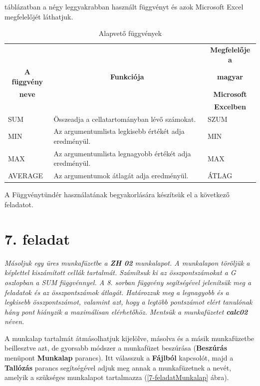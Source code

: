  táblázatban a négy leggyakrabban használt
függvényt és azok Microsoft Excel megfelelőjét láthatjuk.

\begin{table}[!h]
\begin{center}
\caption{Alapvető függvények}\label{AlapvetőFüggvények}
\begin{tabular}{|m{2.5cm}|m{8cm}|m{3cm}|}
\hline
 & & \multicolumn{1}{c|}{\textbf{Megfelelője a}} \\
\multicolumn{1}{|c|}{\textbf{A függvény}}&
\multicolumn{1}{c|}{\textbf{Funkciója}}&
\multicolumn{1}{c|}{\textbf{magyar}} \\
\multicolumn{1}{|c|}{\textbf{neve}} & &
\multicolumn{1}{c|}{\textbf{Microsoft}} \\
 & & \multicolumn{1}{c|}{\textbf{Excelben}} \\
\hline
SUM & Összeadja a cellatartományban lévő számokat. & SZUM \\
\hline
MIN & Az argumentumlista legkisebb értékét adja eredményül. & MIN \\
\hline
MAX & Az argumentumlista legnagyobb értékét adja eredményül. & MAX \\   
\hline
AVERAGE & Az argumentumok átlagát adja eredményül. & ÁTLAG \\
\hline
\end{tabular}
\end{center}
\end{table}

A Függvénytündér használatának begyakorlására
készítsük el a következő feladatot.


\section{7. feladat}

{\itshape
Másoljuk egy üres munkafüzetbe a \textbf{ZH 02} munkalapot. A
munkalapon töröljük a képlettel kiszámított cellák
tartalmát. Számítsuk ki az összpontszámokat a G oszlopban a
SUM függvénnyel. A 8. sorban függvény segítségével
jelenítsük meg a feladatok és az összpontszámok átlagát.
 Határozzuk meg a legnagyobb és a legkisebb összpontszámot,
valamint azt, hogy a legtöbb  pontszámot elért tanulónak
hány pont hiányzik a maximálisan elérhetőhöz. Mentsük a
munkafüzetet \textbf{calc02} néven.}

A munkalap tartalmát átmásolhatjuk kijelölve, másolva és a
másik munkafüzetbe beillesztve azt, de gyorsabb módszer a
munkafüzet beszúrása (\textbf{Beszúrás} menüpont
\textbf{Munkalap} parancs). Itt válasszuk a \textbf{Fájlból}
kapcsolót, majd a \textbf{Tallózás} parancs segítségével
adjuk meg annak a munkafüzetnek a  nevét, amelyik a szükséges
munkalapot tartalmazza (\ref{7-feladatMunkalap} ábra).

